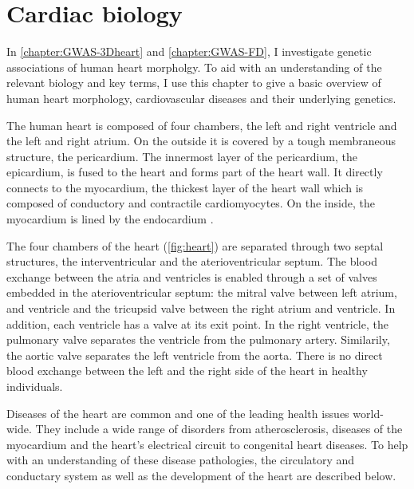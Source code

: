 \chapter{Cardiac biology}
\label{chapter:intro-heart}
In \cref{chapter:GWAS-3Dheart} and \cref{chapter:GWAS-FD}, I investigate genetic associations of human heart morpholgy. To aid with an understanding of the relevant biology and key terms, I use this chapter to give a basic overview of human heart morphology, cardiovascular diseases and their underlying genetics.

The human heart is composed of four chambers, the left and right ventricle and the left and right atrium. On the outside it is covered by a tough membraneous structure, the pericardium. The innermost layer of the  pericardium, the epicardium, is fused to the heart and forms part of the heart wall. It directly connects to the myocardium, the thickest layer of the heart wall which is composed of conductory and contractile cardiomyocytes. On the inside, the myocardium is lined by the endocardium \citep{Betts2013}.  

The four chambers of the heart (\cref{fig:heart}) are separated through two septal structures, the interventricular and the aterioventricular septum. The blood exchange between the atria and ventricles is enabled through a set of valves embedded in the aterioventricular septum: the mitral valve between left atrium, and ventricle and the tricupsid valve between the right atrium and ventricle. In addition, each ventricle has a valve at its exit point. In the right ventricle, the pulmonary valve separates the ventricle from the pulmonary artery. Similarily, the aortic valve separates the left ventricle from the aorta. There is no direct blood exchange between the left and the right side of the heart in healthy individuals. 

Diseases of the heart are common and one of the leading health issues world-wide. They include a wide range of disorders from atherosclerosis, diseases of the myocardium and the heart’s electrical circuit to congenital heart diseases. To help with an understanding of these disease pathologies, the circulatory and conductary system as well as the development of the heart are described below.

